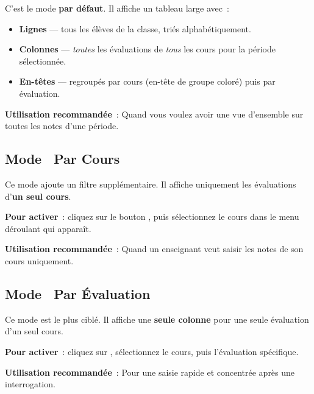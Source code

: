 \begin{etape}[title=Mode Par P\'eriode --- Vue panoramique]
C'est le mode \textbf{par d\'efaut}. Il affiche un tableau large avec~:
\begin{itemize}
  \item \textbf{Lignes} --- tous les \'el\`eves de la classe, tri\'es alphab\'etiquement.
  \item \textbf{Colonnes} --- \textit{toutes} les \'evaluations de \textit{tous} les cours pour la p\'eriode s\'electionn\'ee.
  \item \textbf{En-t\^etes} --- regroup\'es par cours (en-t\^ete de groupe color\'e) puis par \'evaluation.
\end{itemize}

\textbf{Utilisation recommand\'ee}~: Quand vous voulez avoir une vue d'ensemble sur toutes les notes d'une p\'eriode.
\end{etape}

\subsection{Mode \guillemotleft~Par Cours~\guillemotright}

\begin{etape}[title=Mode Par Cours --- Vue cibl\'ee]
Ce mode ajoute un filtre  suppl\'ementaire. Il affiche uniquement les \'evaluations d'\textbf{un seul cours}.

\textbf{Pour activer}~: cliquez sur le bouton , puis s\'electionnez le cours dans le menu d\'eroulant qui appara\^it.

\textbf{Utilisation recommand\'ee}~: Quand un enseignant veut saisir les notes de son cours uniquement.
\end{etape}

\subsection{Mode \guillemotleft~Par \'Evaluation~\guillemotright}

\begin{etape}[title=Mode Par \'Evaluation --- Vue unitaire]
Ce mode est le plus cibl\'e. Il affiche une \textbf{seule colonne} pour une seule \'evaluation d'un seul cours.

\textbf{Pour activer}~: cliquez sur , s\'electionnez le cours, puis l'\'evaluation sp\'ecifique.

\textbf{Utilisation recommand\'ee}~: Pour une saisie rapide et concentr\'ee apr\`es une interrogation.
\end{etape}

